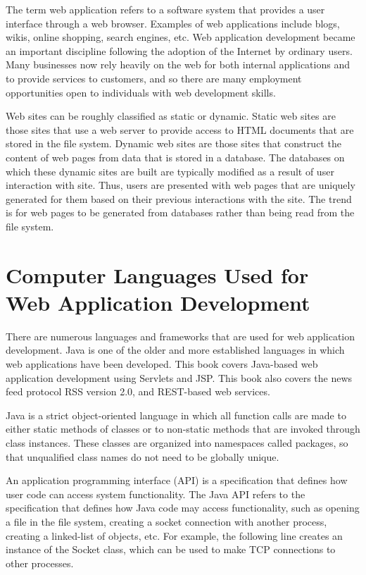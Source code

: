 
The term web application refers to a software system that provides a user interface through a web browser. Examples of web applications include blogs, wikis, online shopping, search engines, etc.\cite{mysql-website} Web application development became an important discipline following the adoption of the Internet by ordinary users. Many businesses now rely heavily on the web for both internal applications and to provide services to customers, and so there are many employment opportunities open to individuals with web development skills.

Web sites can be roughly classified as static or dynamic. Static web sites are those sites that use a web server to provide access to HTML documents that are stored in the file system. Dynamic web sites are those sites that construct the content of web pages from data that is stored in a database. The databases on which these dynamic sites are built are typically modified as a result of user interaction with site. Thus, users are presented with web pages that are uniquely generated for them based on their previous interactions with the site. The trend is for web pages to be generated from databases rather than being read from the file system.

\section{Computer Languages Used for Web Application Development}

There are numerous languages and frameworks that are used for web application development. Java is one of the older and more established languages in which web applications have been developed. This book covers Java-based web application development using Servlets and JSP\cite{bauer2004}. This book also covers the news feed protocol RSS version 2.0, and REST-based web services.

Java is a strict object-oriented language in which all function calls are made to either static methods of classes or to non-static methods that are invoked through class instances. These classes are organized into namespaces called packages, so that unqualified class names do not need to be globally unique.

An application programming interface (API) is a specification that defines how user code can access system functionality. The Java API refers to the specification that defines how Java code may access functionality, such as opening a file in the file system, creating a socket connection with another process, creating a linked-list of objects, etc. For example, the following line creates an instance of the Socket class\cite{johnson2005}, which can be used to make TCP connections to other processes.

